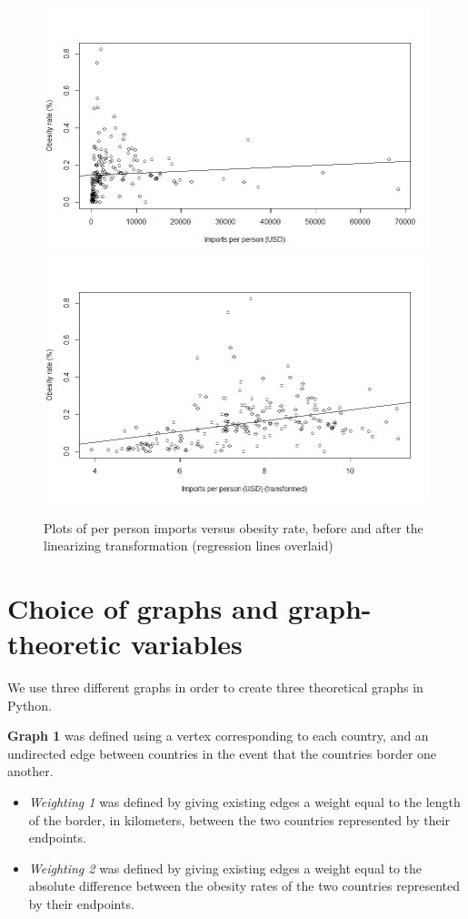 \documentclass[oneside,12pt]{report}
\begin{document}
\begin{figure}
\centering
\label{fig:ppimports-obesity-prepost}
\includegraphics[width=\textwidth]{ppimports-obesity-pretransform.png}
\includegraphics[width=\textwidth]{ppimports-obrate-posttransform.png}
\caption[Scatterplots before and after a linearizing transformation]{Plots of per person imports versus obesity rate, before and after the linearizing transformation (regression lines overlaid)}
\end{figure}

\section*{Choice of graphs and graph-theoretic variables}

We use three different graphs in order to create three theoretical graphs in Python.

\textbf{Graph 1} was defined using a vertex corresponding to each country, and an undirected edge between countries in the event that the countries border one another.
\begin{itemize}
\item \emph{Weighting 1} was defined by giving existing edges a weight equal to the length of the border, in kilometers, between the two countries represented by their endpoints.
\item \emph{Weighting 2} was defined by giving existing edges a weight equal to the absolute difference between the obesity rates of the two countries represented by their endpoints.
\end{itemize}
\end{document}

